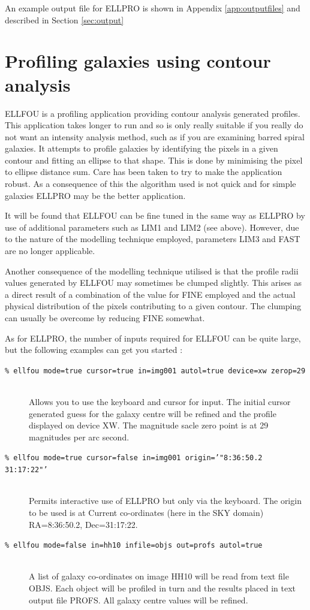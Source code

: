 \documentclass[twoside,11pt]{starlink}
\begin{document}
An example output file for ELLPRO is shown in Appendix \ref{app:outputfiles}
and described in Section \ref{sec:output}

\section{Profiling galaxies using contour analysis}
\label{sec:profc}

ELLFOU is a profiling application providing contour analysis generated profiles.
This application takes longer to run and so is only really suitable if you
really do not want an intensity analysis method, such as if you are
examining barred spiral galaxies. It attempts to profile galaxies by identifying
the pixels in a given contour and fitting an ellipse to that shape. This is
done by minimising the pixel to ellipse distance sum. Care has been taken
to try to make the application robust. As a consequence of this the algorithm
used is not quick and for simple galaxies ELLPRO may be the better application.

It will be found that ELLFOU can be fine tuned in the same way as ELLPRO
by use of additional parameters such as LIM1 and LIM2 (see above). However,
due to the nature of the modelling technique employed, parameters LIM3
and FAST are no longer applicable.

Another consequence of the modelling technique utilised is that the profile
radii values generated by ELLFOU may sometimes be clumped slightly.
This arises as a direct result of a combination of the value for FINE
employed and the actual physical distribution of the pixels contributing
to a given contour. The clumping can usually be overcome by reducing FINE
somewhat.

As for ELLPRO, the number of inputs required for ELLFOU can be quite large,
but the following examples can get you started :

\begin{description}
\item[\texttt{\% ellfou mode=true cursor=true in=img001 autol=true device=xw zerop=29}]
   \mbox{}\\
  Allows you to use the keyboard and cursor for input. The initial cursor
  generated guess for the galaxy centre will be refined and the profile
  displayed on device XW.  The magnitude sacle zero point is at 29
  magnitudes per arc second.
\item[\texttt{\% ellfou mode=true cursor=false in=img001 origin='"8:36:50.2 31:17:22"'}]
  \mbox{}\\
  Permits interactive use of ELLPRO but only via the keyboard. The origin
  to be used is at Current co-ordinates (here in the SKY domain)
  RA=8:36:50.2, Dec=31:17:22.
\item[\texttt{\% ellfou mode=false in=hh10 infile=objs out=profs autol=true}]
   \mbox{}\\
  A list of galaxy co-ordinates on image HH10 will be read from text
  file OBJS. Each object will be profiled in turn and the results placed in
  text output file PROFS. All galaxy centre values will be refined.
\end{description}
\end{document}
